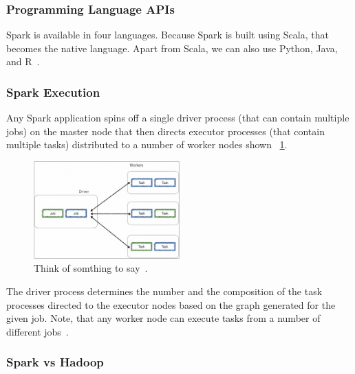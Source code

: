 \documentclass[]{final_report}
\begin{document}
\subsubsection{Programming Language APIs}

Spark is available in four languages. Because Spark is built using Scala, that becomes the native language. Apart from Scala, we can also use Python, Java, and R~\cite{singh_manage_2022}.

\subsubsection{Spark Execution}

Any Spark application spins off a single driver process (that can contain multiple jobs) on the master node that then directs executor processes (that contain multiple tasks) distributed to a number of worker nodes shown ~\ref{fig:Execute.png}.

\begin{figure}[ht]
    \centering
    \includegraphics[width=0.5\textwidth]{Execute.png}
    \caption{\label{fig:Execute.png}Think of somthing to say~\cite{drabas_learning_2017}.}
\end{figure}


The driver process determines the number and the composition of the task processes directed to the executor nodes based on the graph generated for the given job. Note, that any worker node can execute tasks from a number of different jobs~\cite{drabas_learning_2017}.

\clearpage

\subsubsection{Spark vs Hadoop}
\end{document}
